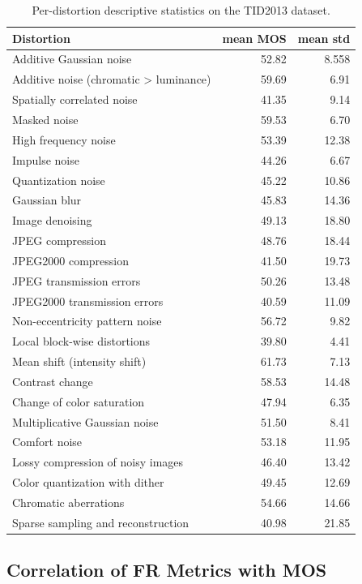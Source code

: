 \begin{table}[htpb]
\centering
\caption{Per-distortion descriptive statistics on the \acs{TID}2013 dataset.}\label{tab:tid_method_stats}
\begin{tabular}{lrr}
\hline
\textbf{Distortion} & \textbf{mean \acs{MOS}} & \textbf{mean std} \\
\hline
Additive Gaussian noise & 52.82 & 8.558 \\
Additive noise (chromatic > luminance) & 59.69 & 6.91 \\
Spatially correlated noise & 41.35 & 9.14 \\
Masked noise & 59.53 & 6.70 \\
High frequency noise & 53.39 & 12.38 \\
Impulse noise & 44.26 & 6.67 \\
Quantization noise & 45.22 & 10.86 \\
Gaussian blur & 45.83 & 14.36 \\
Image denoising & 49.13 & 18.80 \\
\acs{JPEG} compression & 48.76 & 18.44 \\
\acs{JPEG}2000 compression & 41.50 & 19.73 \\
\acs{JPEG} transmission errors & 50.26 & 13.48 \\
\acs{JPEG}2000 transmission errors & 40.59 & 11.09 \\
Non-eccentricity pattern noise & 56.72 & 9.82 \\
Local block-wise distortions & 39.80 & 4.41 \\
Mean shift (intensity shift) & 61.73 & 7.13 \\
Contrast change & 58.53 & 14.48 \\
Change of color saturation & 47.94 & 6.35 \\
Multiplicative Gaussian noise & 51.50 & 8.41 \\
Comfort noise & 53.18 & 11.95 \\
Lossy compression of noisy images & 46.40 & 13.42 \\
Color quantization with dither & 49.45 & 12.69 \\
Chromatic aberrations & 54.66 & 14.66 \\
Sparse sampling and reconstruction & 40.98 & 21.85 \\
\hline
\end{tabular}
\end{table}

\subsection{Correlation of \acs{FR} Metrics with \acs{MOS}}

